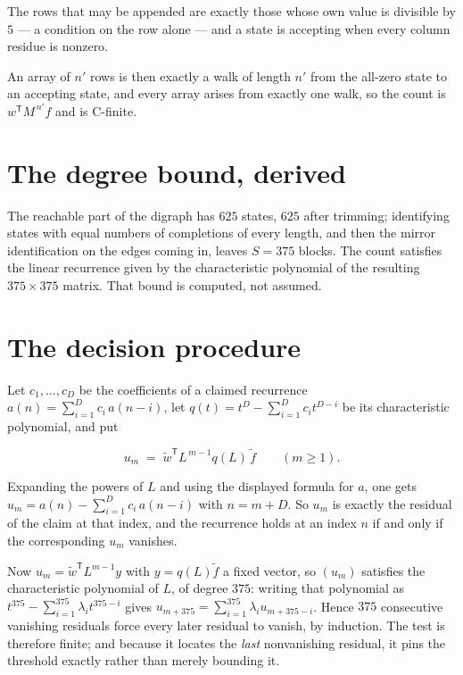 \documentclass[11pt]{article}
\theoremstyle{definition}
\begin{document}
The rows that may be appended are exactly those whose own value is divisible by $5$ --- a condition on the row alone --- and a state is accepting when every column residue is nonzero.

An array of $n'$ rows is then exactly a walk of length $n'$ from the all-zero state to an accepting state, and every array arises from exactly one walk, so the count is $w^{\mathsf T}M^{\,n'}f$ and is C-finite.

\section{The degree bound, derived}

The reachable part of the digraph has $625$ states, $625$ after trimming; identifying states with equal numbers of completions of every length, and then the mirror identification on the edges coming in, leaves $S = 375$ blocks. The count satisfies the linear recurrence given by the characteristic polynomial of the resulting $375\times375$ matrix. That bound is computed, not assumed.

\section{The decision procedure}

Let $c_1,\dots,c_D$ be the coefficients of a claimed recurrence $a(n) = \sum_{i=1}^{D} c_i\,a(n-i)$, let $q(t) = t^{D} - \sum_{i=1}^{D} c_i t^{D-i}$ be its characteristic polynomial, and put

\[u_m \;=\; \tilde w^{\mathsf T} L^{\,m-1} q(L)\,\tilde f \qquad (m \ge 1).\]

Expanding the powers of $L$ and using the displayed formula for $a$, one gets $u_m = a(n) - \sum_{i=1}^{D} c_i\,a(n-i)$ with $n = m + D$. So $u_m$ is exactly the residual of the claim at that index, and the recurrence holds at an index $n$ if and only if the corresponding $u_m$ vanishes.

Now $u_m = \tilde w^{\mathsf T} L^{m-1} y$ with $y = q(L)\tilde f$ a fixed vector, so $(u_m)$ satisfies the characteristic polynomial of $L$, of degree $375$: writing that polynomial as $t^{375} - \sum_{i=1}^{375} \lambda_i t^{375-i}$ gives $u_{m+375} = \sum_{i=1}^{375} \lambda_i u_{m+375-i}$. Hence $375$ consecutive vanishing residuals force every later residual to vanish, by induction. The test is therefore finite; and because it locates the {\itshape last} nonvanishing residual, it pins the threshold exactly rather than merely bounding it.
\end{document}
